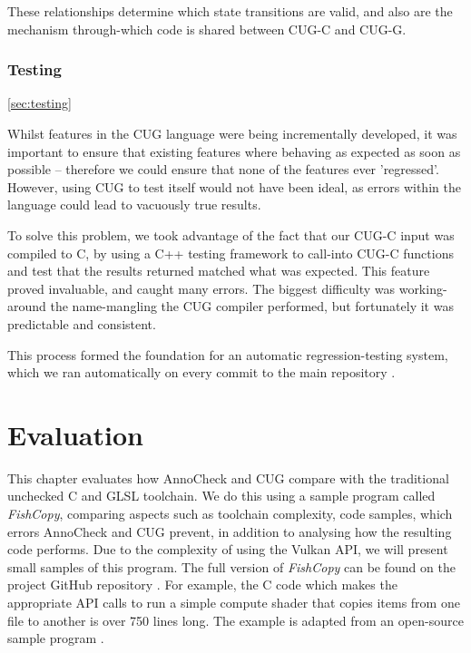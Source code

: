 \documentclass[a4paper,12pt,twoside,openright]{report}
\begin{document}
These relationships determine which state transitions are valid, and also are
the mechanism through-which code is shared between CUG-C and CUG-G.

\subsection{Testing}

\ref{sec:testing}

Whilst features in the CUG language were being incrementally developed, it was
important to ensure that existing features where behaving as expected as soon
as possible -- therefore we could ensure that none of the features ever
'regressed'. However, using CUG to test itself would not have been ideal, as
errors within the language could lead to vacuously true results.

To solve this problem, we took advantage of the fact that our CUG-C input was
compiled to C, by using a C++ testing framework to call-into CUG-C functions
and test that the results returned matched what was expected. This feature
proved invaluable, and caught many errors. The biggest difficulty was
working-around the name-mangling the CUG compiler performed, but fortunately it
was predictable and consistent.

This process formed the foundation for an automatic regression-testing system,
which we ran automatically on every commit to the main repository
\cite{ProjectSource} \cite{AutomatedTestCode} \cite{AutomatedTestOutput}.




\chapter{Evaluation}

\label{chp:evaluation}


This chapter evaluates how AnnoCheck and CUG compare with the traditional
unchecked C and GLSL toolchain. We do this using a sample program called
\textit{FishCopy}, comparing aspects such as toolchain complexity, code
samples, which errors AnnoCheck and CUG prevent, in addition to analysing how
the resulting code performs. Due to the complexity of using the Vulkan API, we
will present small samples of this program. The full version of
\textit{FishCopy} can be found on the project GitHub repository
\cite{ProjectSource}. For example, the C code which makes the appropriate API
calls to run a simple compute shader that copies items from one file to another
is over 750 lines long. The example is adapted from an open-source sample
program \cite{VulkanComputeExampleSource}.
\end{document}
